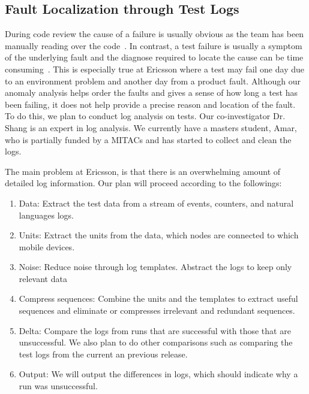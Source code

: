 \subsection{Fault Localization through Test Logs}


During code review the cause of a failure is usually obvious as the team has been manually reading over the code~\cite{}. In contrast, a test failure is usually a symptom of the underlying fault and the diagnose required to locate the cause can be time consuming~\cite{}. This is especially true at Ericsson where a test may fail one day due to an environment problem and another day from a product fault. Although our anomaly analysis helps order the faults and gives a sense of how long a test has been failing, it does not help provide a precise reason and location of the fault. To do this, we plan to conduct log analysis on tests. Our co-investigator Dr. Shang is an expert in log analysis. We currently have a masters student, Amar, who is partially funded by a MITACs and has started to collect and clean the logs.

The main problem at Ericsson, is that there is an overwhelming amount of detailed log information. Our plan will proceed according to the followings:

\begin{enumerate}

\item Data: Extract the test data from a stream of events, counters, and natural languages logs.

\item Units: Extract the units from the data, \ie which nodes are connected to which mobile devices.

\item Noise: Reduce noise through log templates. Abstract the logs to keep only relevant data 

\item Compress sequences: Combine the units and the templates to extract useful sequences and eliminate or compresses irrelevant and redundant sequences.

\item Delta: Compare the logs from runs that are successful with those that are unsuccessful. We also plan to do other comparisons such as comparing the test logs from the current an previous release.

\item Output: We will output the differences in logs, which should indicate why a run was unsuccessful.

\end{enumerate}

